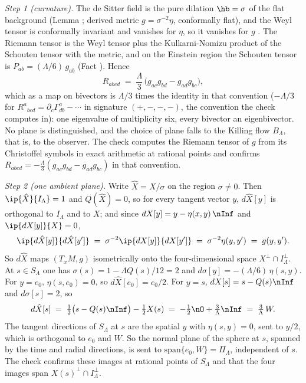 \emph{Step 1 (curvature).} The de Sitter field is the pure dilation $\hb = \sigma$ of the flat background (Lemma ; derived metric $g = \sigma^{-2}\eta$, conformally flat), and the Weyl tensor is conformally invariant and vanishes for $\eta$, so it vanishes for $g$ \cite{Wald1984}. The Riemann tensor is the Weyl tensor plus the Kulkarni-Nomizu product of the Schouten tensor with the metric, and on the Einstein region the Schouten tensor is $P_{ab} = (\Lambda/6)\,g_{ab}$ (Fact ). Hence
\[
R_{abcd} \;=\; \frac{\Lambda}{3}\,\bigl(g_{ac}g_{bd} - g_{ad}g_{bc}\bigr),
\]
which as a map on bivectors is $\Lambda/3$ times the identity in that convention ($-\Lambda/3$ for $R^{a}{}_{bcd} = \partial_{c}\Gamma^{a}_{db} - \cdots$ in signature $(+,-,-,-)$, the convention the check computes in): one eigenvalue of multiplicity six, every bivector an eigenbivector. No plane is distinguished, and the choice of plane falls to the Killing flow $B_{\Lambda}$, that is, to the observer. The check computes the Riemann tensor of $g$ from its Christoffel symbols in exact arithmetic at rational points and confirms $R_{abcd} = -\tfrac{\Lambda}{3}(g_{ac}g_{bd} - g_{ad}g_{bc})$ in that convention.

\emph{Step 2 (one ambient plane).} Write $\hat X = X/\sigma$ on the region $\sigma \neq 0$. Then $\ip{\hat X}{I_{\Lambda}} = 1$ and $Q(\hat X) = 0$, so for every tangent vector $y$, $d\hat X[y]$ is orthogonal to $I_{\Lambda}$ and to $X$; and since $dX[y] = y - \eta(x,y)\,\nInf$ and $\ip{dX[y]}{X} = 0$,
\[
\ip{d\hat X[y]}{d\hat X[y']} \;=\; \sigma^{-2}\ip{dX[y]}{dX[y']} \;=\; \sigma^{-2}\eta(y, y') \;=\; g(y, y').
\]
So $d\hat X$ maps $(T_{x}M, g)$ isometrically onto the four-dimensional space $X^{\perp} \cap I_{\Lambda}^{\perp}$. At $s \in S_{\Lambda}$ one has $\sigma(s) = 1 - \Lambda Q(s)/12 = 2$ and $d\sigma[y] = -(\Lambda/6)\,\eta(s, y)$. For $y = e_{0}$, $\eta(s, e_{0}) = 0$, so $d\hat X[e_{0}] = e_{0}/2$. For $y = s$, $dX[s] = s - Q(s)\nInf$ and $d\sigma[s] = 2$, so
\[
d\hat X[s] \;=\; \tfrac12\bigl(s - Q(s)\nInf\bigr) - \tfrac12 X(s) \;=\; -\tfrac12\nO + \tfrac{3}{\Lambda}\nInf \;=\; \tfrac{3}{\Lambda}\,W .
\]
The tangent directions of $S_{\Lambda}$ at $s$ are the spatial $y$ with $\eta(s, y) = 0$, sent to $y/2$, which is orthogonal to $e_{0}$ and $W$. So the normal plane of the sphere at $s$, spanned by the time and radial directions, is sent to $\mathrm{span}\{e_{0}, W\} = \Pi_{\Lambda}$, independent of $s$. The check confirms these images at rational points of $S_{\Lambda}$ and that the four images span $X(s)^{\perp} \cap I_{\Lambda}^{\perp}$.


